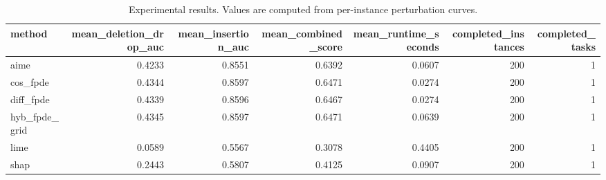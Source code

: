 \begin{table}[t]
\caption{Experimental results. Values are computed from per-instance perturbation curves.}
\label{tab:main_results_computed}
\centering
\begin{tabular}{lrrrrrr}
\toprule
method & mean\_deletion\_drop\_auc & mean\_insertion\_auc & mean\_combined\_score & mean\_runtime\_seconds & completed\_instances & completed\_tasks \\
\midrule
aime & 0.4233 & 0.8551 & 0.6392 & 0.0607 & 200 & 1 \\
cos\_fpde & 0.4344 & 0.8597 & 0.6471 & 0.0274 & 200 & 1 \\
diff\_fpde & 0.4339 & 0.8596 & 0.6467 & 0.0274 & 200 & 1 \\
hyb\_fpde\_grid & 0.4345 & 0.8597 & 0.6471 & 0.0639 & 200 & 1 \\
lime & 0.0589 & 0.5567 & 0.3078 & 0.4405 & 200 & 1 \\
shap & 0.2443 & 0.5807 & 0.4125 & 0.0907 & 200 & 1 \\
\bottomrule
\end{tabular}

\end{table}
